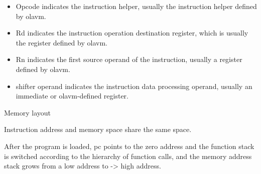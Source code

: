 \begin{itemize}
    \item Opcode indicates the instruction helper, usually the instruction helper defined by olavm.\par
    \item Rd indicates the instruction operation destination register, which is usually the register defined by olavm.\par
    \item Rn indicates the first source operand of the instruction, usually a register defined by olavm.\par
    \item shifter operand indicates the instruction data processing operand, usually an immediate or olavm-defined register.
\end{itemize}

Memory layout\par
Instruction address and memory space share the same space.

After the program is loaded, pc points to the zero address and the function stack is switched according to the hierarchy of function calls, 
and the memory address stack grows from a low address to -> high address.